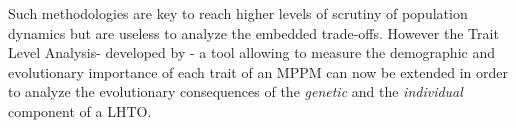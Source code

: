 \documentclass[10pt,a4paper]{article}
\newcommand{\TLA}{Trait Level Analysis}
\begin{document}
Such methodologies are key to reach  higher levels of scrutiny of population dynamics but are useless to analyze the embedded trade-offs. However the \TLA - developed by \citet{Coste2017} - a tool allowing to measure the demographic and evolutionary importance of each trait of an MPPM can now be extended in order to analyze the evolutionary consequences of the \emph{genetic} and the \emph{individual} component of a LHTO.
\end{document}
